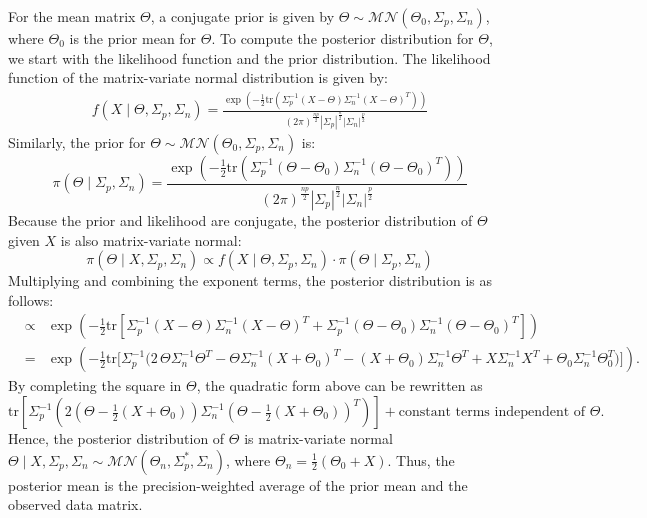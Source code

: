 \documentclass[twoside]{article}
\begin{document}
For the mean matrix $\Theta$, a conjugate prior is given by $\Theta \sim \mathcal{MN}(\Theta_0, \Sigma_p, \Sigma_n)$, where $\Theta_0$ is the prior mean for $\Theta$.
To compute the posterior distribution for $\Theta$, we start with the likelihood function and the prior distribution. The likelihood function of the matrix-variate normal distribution is given by:
\begin{eqnarray}\label{like}
f(X \mid \Theta, \Sigma_p, \Sigma_n) = 
\frac{
\exp\left(-\frac{1}{2} \mathrm{tr} \left( \Sigma_p^{-1} (X - \Theta) \Sigma_n^{-1} (X - \Theta)^T \right)\right)
}{
(2\pi)^{\frac{np}{2}} |\Sigma_p|^{\frac{n}{2}} |\Sigma_n|^{\frac{p}{2}}
}
\end{eqnarray}
Similarly, the prior for $\Theta \sim \mathcal{MN}(\Theta_0, \Sigma_p, \Sigma_n)$ is:
\[
\pi(\Theta \mid \Sigma_p, \Sigma_n) = 
\frac{
\exp\left(-\frac{1}{2} \mathrm{tr} \left( \Sigma_p^{-1} (\Theta - \Theta_0) \Sigma_n^{-1} (\Theta - \Theta_0)^T \right)\right)
}{
(2\pi)^{\frac{np}{2}} |\Sigma_p|^{\frac{n}{2}} |\Sigma_n|^{\frac{p}{2}}
}
\]
Because the prior and likelihood are conjugate, the posterior distribution of $\Theta$ given $X$ is also matrix-variate normal:
\[
\pi(\Theta \mid X, \Sigma_p, \Sigma_n) \propto f(X \mid \Theta, \Sigma_p, \Sigma_n) \cdot \pi(\Theta \mid \Sigma_p, \Sigma_n)
\]
Multiplying and combining the exponent terms, the posterior distribution is as follows:
\begin{eqnarray*}
&\propto & 
\exp\left(-\frac{1}{2} \mathrm{tr} \left[ 
\Sigma_p^{-1} (X - \Theta) \Sigma_n^{-1} (X - \Theta)^{T} 
+ \Sigma_p^{-1} (\Theta - \Theta_0) \Sigma_n^{-1} (\Theta - \Theta_0)^{T}
\right] \right) \\
&=& 
\exp\left(-\frac{1}{2} \mathrm{tr} \Big[
\Sigma_p^{-1} 
\Big( 2\,\Theta \Sigma_n^{-1} \Theta^{T} - \Theta \Sigma_n^{-1} (X + \Theta_0)^{T}
- (X + \Theta_0) \Sigma_n^{-1} \Theta^{T}
+ X \Sigma_n^{-1} X^{T} + \Theta_0 \Sigma_n^{-1} \Theta_0^{T}
\Big) \Big] \right).
\end{eqnarray*}
By completing the square in $\Theta$, the quadratic form above can be rewritten as
\[
\mathrm{tr}\!\left[
\Sigma_p^{-1}
\left( 2(\Theta - \tfrac{1}{2}(X+\Theta_0)) \Sigma_n^{-1} (\Theta - \tfrac{1}{2}(X+\Theta_0))^{T}
\right) \right] + \text{constant terms independent of } \Theta.
\]
Hence, the posterior distribution of $\Theta$ is matrix-variate normal $
\Theta \mid X, \Sigma_p, \Sigma_n 
\sim \mathcal{MN}(\Theta_n, \Sigma_p^*, \Sigma_n)$, where $\Theta_n = \frac{1}{2}(\Theta_0 + X)$. Thus, the posterior mean is the precision-weighted average of the prior mean and the observed data matrix.
\end{document}
